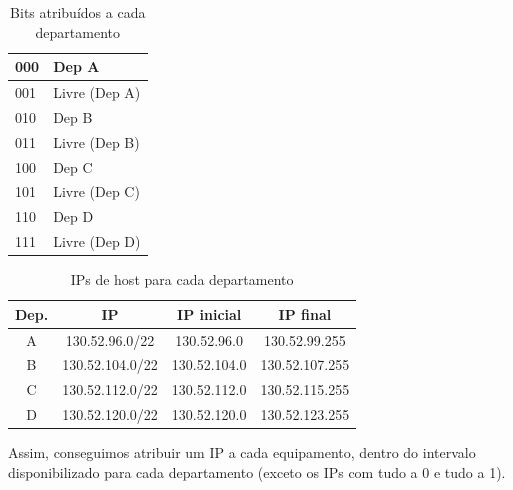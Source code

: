 \documentclass[11pt]{article}
\begin{document}
\begin{table}[hbt!]
    \centering
    \begin{tabular}{|l|l|}
    \hline
    \multicolumn{1}{|c|}{000} & Dep A \\ \hline
    001                       & Livre (Dep A) \\ \hline
    010                       & Dep B \\ \hline
    011                       & Livre (Dep B) \\ \hline
    100                       & Dep C \\ \hline
    101                       & Livre (Dep C) \\ \hline
    110                       & Dep D \\ \hline
    111                       & Livre (Dep D) \\ \hline
    \end{tabular}
    \caption{Bits atribuídos a cada departamento}
\end{table}

\begin{table}[htb!]
    \centering
    \begin{tabular}{|c|c|c|c|}
    \hline
    Dep. & IP              & IP inicial   & IP final       \\ \hline
    A    & 130.52.96.0/22  & 130.52.96.0  & 130.52.99.255  \\ \hline
    B    & 130.52.104.0/22 & 130.52.104.0 & 130.52.107.255 \\ \hline
    C    & 130.52.112.0/22 & 130.52.112.0 & 130.52.115.255 \\ \hline
    D    & 130.52.120.0/22 & 130.52.120.0 & 130.52.123.255 \\ \hline
    \end{tabular}
    \caption{IPs de host para cada departamento}
\end{table}

Assim, conseguimos atribuir um IP a cada equipamento, dentro do intervalo disponibilizado para cada departamento (exceto os IPs com tudo a 0 e tudo a 1).
\end{document}
